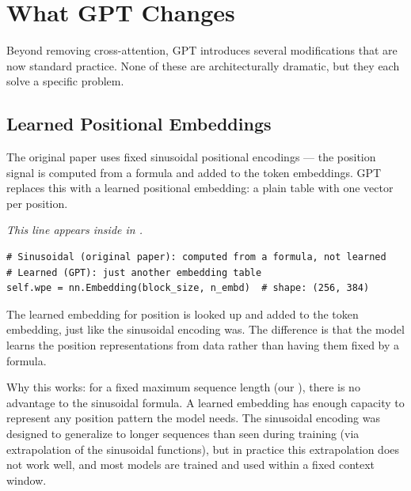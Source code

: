 \section{What GPT Changes}

Beyond removing cross-attention, GPT introduces several modifications that are now standard practice. None of these are architecturally dramatic, but they each solve a specific problem.

\subsection{Learned Positional Embeddings}

The original paper uses fixed sinusoidal positional encodings --- the position signal is computed from a formula and added to the token embeddings. GPT replaces this with a learned positional embedding: a plain  table with one vector per position.

\concepttag
{\small\itshape This line appears inside  in .}
\begin{lstlisting}
# Sinusoidal (original paper): computed from a formula, not learned
# Learned (GPT): just another embedding table
self.wpe = nn.Embedding(block_size, n_embd)  # shape: (256, 384)
\end{lstlisting}

The learned embedding for position  is looked up and added to the token embedding, just like the sinusoidal encoding was. The difference is that the model learns the position representations from data rather than having them fixed by a formula.

Why this works: for a fixed maximum sequence length (our ), there is no advantage to the sinusoidal formula. A learned embedding has enough capacity to represent any position pattern the model needs. The sinusoidal encoding was designed to generalize to longer sequences than seen during training (via extrapolation of the sinusoidal functions), but in practice this extrapolation does not work well, and most models are trained and used within a fixed context window.


